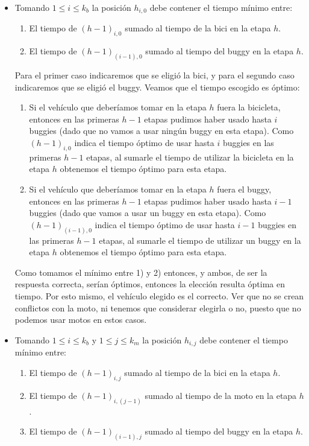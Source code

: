 \begin{itemize}
\begin{itemize}
		\item Tomando $1\leq i \leq k_{b}$ la posición $h_{i,0}$ debe contener el tiempo mínimo entre:
		\begin{enumerate}
			\item El tiempo de $(h-1)_{i,0}$ sumado al tiempo de la bici en la etapa $h$.
			\item El tiempo de $(h-1)_{(i-1),0}$ sumado al tiempo del buggy en la etapa $h$.
		\end{enumerate} 
		Para el primer caso indicaremos que se eligió la bici, y para el segundo caso indicaremos que se eligió el buggy. Veamos que el tiempo escogido es óptimo:
		\begin{enumerate}
			\item Si el vehículo que deberíamos tomar en la etapa $h$ fuera la bicicleta, entonces en las primeras $h-1$ etapas pudimos haber usado hasta $i$ buggies (dado que no vamos a usar ningún buggy en esta etapa).  Como $(h-1)_{i,0}$ indica el tiempo óptimo de usar hasta $i$ buggies en las primeras $h-1$ etapas, al sumarle el tiempo de utilizar la bicicleta en la etapa $h$ obtenemos el tiempo óptimo para esta etapa.
			\item Si el vehículo que deberíamos tomar en la etapa $h$ fuera el buggy, entonces en las primeras $h-1$ etapas pudimos haber usado hasta $i-1$ buggies (dado que vamos a usar un buggy en esta etapa).  Como $(h-1)_{(i-1),0}$ indica el tiempo óptimo de usar hasta $i-1$ buggies en las primeras $h-1$ etapas, al sumarle el tiempo de utilizar un buggy en la etapa $h$ obtenemos el tiempo óptimo para esta etapa.
		\end{enumerate}
		Como tomamos el mínimo entre 1) y 2) entonces, y ambos, de ser la respuesta correcta, serían óptimos, entonces la elección resulta óptima en tiempo. Por esto mismo, el vehículo elegido es el correcto. Ver que no se crean conflictos con la moto, ni tenemos que considerar elegirla o no, puesto que no podemos usar motos en estos casos.
		\item Tomando $1 \leq i \leq k_{b}$ y $1 \leq j \leq k_{m}$ la posición $h_{i,j}$ debe contener el tiempo mínimo entre:
		\begin{enumerate}
			\item El tiempo de $(h-1)_{i,j}$ sumado al tiempo de la bici en la etapa $h$.
			\item El tiempo de $(h-1)_{i,(j-1)}$ sumado al tiempo de la moto en la etapa $h$.
			\item El tiempo de $(h-1)_{(i-1),j}$ sumado al tiempo del buggy en la etapa $h$.

\end{enumerate}
\end{itemize}
\end{itemize}
